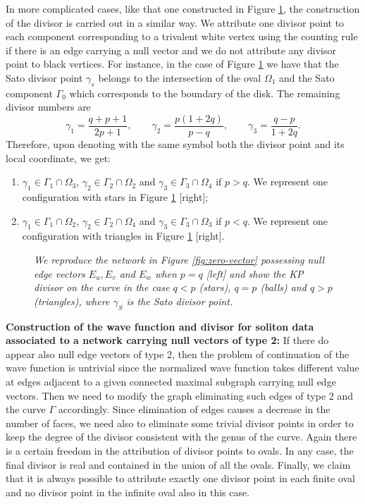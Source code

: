 \documentclass[11pt]{amsart}
\theoremstyle{plain}
\numberwithin{equation}{section}
\begin{document}
In more complicated cases, like that one constructed in Figure \ref{fig:div_null_new}, the construction of the divisor is carried out in a similar way. We attribute one divisor point to each component corresponding to a trivalent white vertex using the counting rule if there is an edge carrying a null vector and we do not attribute any divisor point to black vertices. 
For instance, in the case of Figure \ref{fig:div_null_new} we have that the Sato divisor point $\gamma_s$ belongs to the intersection of the oval $\Omega_1$ and the Sato component $\Gamma_0$ which corresponds to the boundary of the disk.
The remaining divisor numbers are
\[
\gamma_1 = \frac{q+p+1}{2p+1}, \quad\quad \gamma_2 = \frac{p(1+2q)}{p-q}, \quad\quad \gamma_3 = \frac{q-p}{1+2q}.
\]
Therefore, upon denoting with the same symbol both the divisor point and its local coordinate, we get: 
\begin{enumerate}
\item $\gamma_1 \in \Gamma_1 \cap \Omega_3$, $\gamma_2 \in \Gamma_2 \cap \Omega_2$ and $\gamma_3 \in \Gamma_3 \cap \Omega_4$ if
$p>q$. We represent one configuration with stars in Figure \ref{fig:div_null_new} [right];
\item $\gamma_1 \in \Gamma_1 \cap \Omega_2$, $\gamma_2 \in \Gamma_2 \cap \Omega_4$ and $\gamma_3 \in \Gamma_3 \cap \Omega_3$ if
$p<q$. We represent one configuration with triangles in Figure \ref{fig:div_null_new} [right].
\end{enumerate}

\begin{figure}%
	\vspace{-.7 truecm}
  \caption{\small{\sl We reproduce the network in Figure \ref{fig:zero-vector} possessing null edge vectors $E_u,E_v$ and $E_w$ when $p=q$ [left] and show the KP divisor on the curve in the case $q<p$ (stars), $q=p$ (balls) and $q>p$ (triangles), where $\gamma_S$ is the Sato divisor point.}\label{fig:div_null_new}}
\end{figure}

\smallskip

\textbf{Construction of the wave function and divisor for soliton data associated to a network carrying null vectors of type 2:}
If there do appear also null edge vectors of type 2, then the problem of continuation of the wave function is untrivial since
the normalized wave function takes different value at edges adjacent to a given connected maximal subgraph carrying null edge vectors. Then we need to modify the graph eliminating such edges of type 2 and the curve $\Gamma$ accordingly. Since elimination of edges causes a decrease in the number of faces, we need also to eliminate some trivial divisor points in order to keep the degree of the divisor consistent with the genus of the curve. Again there is a certain freedom in the attribution of divisor points to ovals. In any case, the final divisor is real and contained in the union of all the ovals. Finally, we claim that it is always possible to attribute exactly one divisor point in each finite oval and no divisor point in the infinite oval also in this case. 
\end{document}
